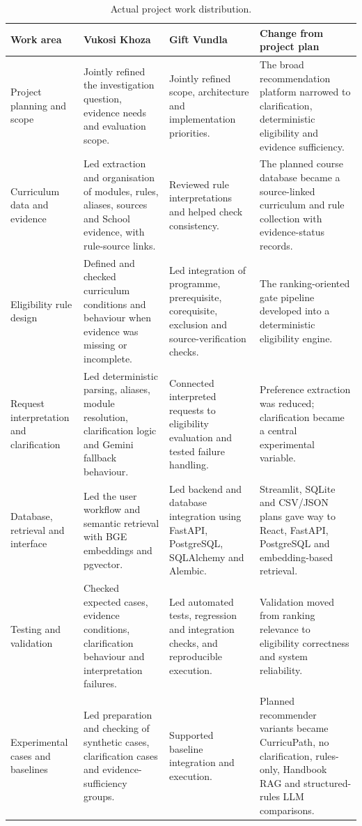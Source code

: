 \begin{table}[!ht]
\caption{Actual project work distribution.}
\label{tab:split}
\centering
\small
\setlength{\tabcolsep}{1mm}
\renewcommand{\arraystretch}{1.12}
\begin{tabular}{p{27mm}p{43mm}p{43mm}p{49mm}}
\hline
\textbf{Work area} & \textbf{Vukosi Khoza} & \textbf{Gift Vundla} & \textbf{Change from project plan}\\
\hline
Project planning and scope & Jointly refined the investigation question, evidence needs and evaluation scope. & Jointly refined scope, architecture and implementation priorities. & The broad recommendation platform narrowed to clarification, deterministic eligibility and evidence sufficiency.\\
Curriculum data and evidence & Led extraction and organisation of modules, rules, aliases, sources and School evidence, with rule-source links. & Reviewed rule interpretations and helped check consistency. & The planned course database became a source-linked curriculum and rule collection with evidence-status records.\\
Eligibility rule design & Defined and checked curriculum conditions and behaviour when evidence was missing or incomplete. & Led integration of programme, prerequisite, corequisite, exclusion and source-verification checks. & The ranking-oriented gate pipeline developed into a deterministic eligibility engine.\\
Request interpretation and clarification & Led deterministic parsing, aliases, module resolution, clarification logic and Gemini fallback behaviour. & Connected interpreted requests to eligibility evaluation and tested failure handling. & Preference extraction was reduced; clarification became a central experimental variable.\\
Database, retrieval and interface & Led the user workflow and semantic retrieval with BGE embeddings and pgvector. & Led backend and database integration using FastAPI, PostgreSQL, SQLAlchemy and Alembic. & Streamlit, SQLite and CSV/JSON plans gave way to React, FastAPI, PostgreSQL and embedding-based retrieval.\\
Testing and validation & Checked expected cases, evidence conditions, clarification behaviour and interpretation failures. & Led automated tests, regression and integration checks, and reproducible execution. & Validation moved from ranking relevance to eligibility correctness and system reliability.\\
Experimental cases and baselines & Led preparation and checking of synthetic cases, clarification cases and evidence-sufficiency groups. & Supported baseline integration and execution. & Planned recommender variants became CurricuPath, no clarification, rules-only, Handbook RAG and structured-rules LLM comparisons.\\

\end{tabular}
\end{table}
